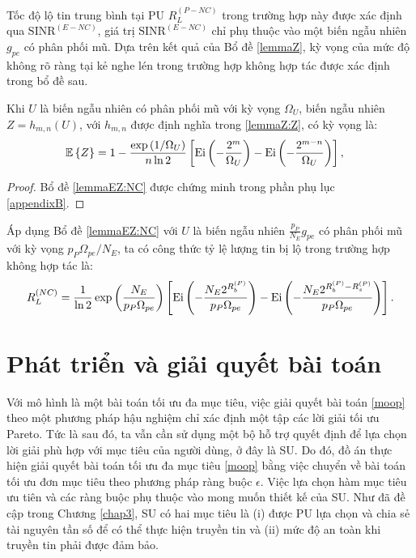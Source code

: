 \documentclass[../main.tex]{subfiles}
\begin{document}
Tốc độ lộ tin trung bình tại PU $R_L^{(P-NC)}$ trong trường hợp này được xác định qua $\text{SINR}^{(E-NC)}$, giá trị $\text{SINR}^{(E-NC)}$ chỉ phụ thuộc vào một biến ngẫu nhiên $g_{pe}$ có phân phối mũ. Dựa trên kết quả của Bổ đề \ref{lemmaZ}, kỳ vọng của mức độ không rõ ràng tại kẻ nghe lén trong trường hợp không hợp tác được xác định trong bổ đề sau.

\begin{lemma}\label{lemmaEZ:NC}
Khi $U$ là biến ngẫu nhiên có phân phối mũ với kỳ vọng $\Omega_U$, biến ngẫu nhiên $Z = h_{m, n}\left(U\right)$, với $h_{m, n}$ được định nghĩa trong \eqref{lemmaZ:Z}, có kỳ vọng là:
\begin{equation}\label{lemmaEZ:EZNC}
\begin{aligned}
    \mathbb{E}\left\{Z\right\} 
    &= 1 - \frac{\exp\left(1/\Omega_U\right)}{n\ln{2}}\left[\textnormal{Ei}\left(-\frac{2^{m}}{\Omega_U}\right)-\textnormal{Ei}\left(-\frac{2^{m-n}}{\Omega_U}\right)\right],
\end{aligned}
\end{equation}
\end{lemma}
\begin{proof}
Bổ đề \ref{lemmaEZ:NC} được chứng minh trong phần phụ lục \ref{appendixB}.
\end{proof}

Áp dụng Bổ đề \ref{lemmaEZ:NC} với $U$ là biến ngẫu nhiên $\frac{p_P}{N_E}g_{pe}$ có phân phối mũ với kỳ vọng $p_P\Omega_{pe}/N_E$, ta có công thức tỷ lệ lượng tin bị lộ trong trường hợp không hợp tác là:
\begin{equation}\label{rlnc}
    R_L^{(NC)}
    =  \frac{1}{\ln{2}}\exp\left(\frac{N_E}{p_P\Omega_{pe}}\right)\left[\textnormal{Ei}\left(-\frac{N_E2^{R_b^{(P)}}}{p_P\Omega_{pe}}\right)-\textnormal{Ei}\left(-\frac{N_E2^{R_b^{(P)}-R_s^{(P)}}}{p_P\Omega_{pe}}\right)\right].
\end{equation}

\section{Phát triển và giải quyết bài toán}

Với mô hình là một bài toán tối ưu đa mục tiêu, việc giải quyết bài toán \eqref{moop} theo một phương pháp hậu nghiệm chỉ xác định một tập các lời giải tối ưu Pareto. Tức là sau đó, ta vẫn cần sử dụng một bộ hỗ trợ quyết định để lựa chọn lời giải phù hợp với mục tiêu của người dùng, ở đây là SU. Do đó, đồ án thực hiện giải quyết bài toán tối ưu đa mục tiêu \eqref{moop} bằng việc chuyển về bài toán tối ưu đơn mục tiêu theo phương pháp ràng buộc $\epsilon$. Việc lựa chọn hàm mục tiêu ưu tiên và các ràng buộc phụ thuộc vào mong muốn thiết kế của SU. Như đã đề cập trong Chương \ref{chap3}, SU có hai mục tiêu là (i) được PU lựa chọn và chia sẻ tài nguyên tần số để có thể thực hiện truyền tin và (ii) mức độ an toàn khi truyền tin phải được đảm bảo.
\end{document}
